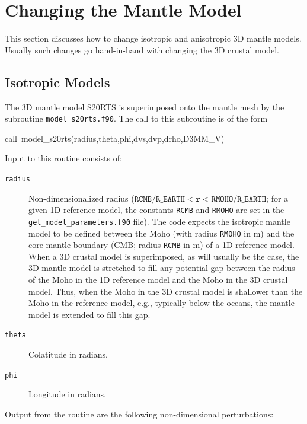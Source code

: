 \documentclass[oneside,english]{book}
\newenvironment{lyxcode}
{\begin{list}{}{
\setlength{\rightmargin}{\leftmargin}
\setlength{\listparindent}{0pt}%
\raggedright
\setlength{\itemsep}{0pt}
\setlength{\parsep}{0pt}
\normalfont\ttfamily}%
 \item[]}
{\end{list}}
\begin{document}
\section{{\normalsize \label{sec:Changing-the-Mantle}}Changing the Mantle
Model}

This section discusses how to change isotropic and anisotropic 3D
mantle models. Usually such changes go hand-in-hand with changing
the 3D crustal model.


\subsection{{\normalsize \label{sub:Isotropic-Models}Isotropic Models}}

The 3D mantle model S20RTS \citep{RiVaWo99} is superimposed onto
the mantle mesh by the subroutine \texttt{model\_s20rts.f90}. The
call to this subroutine is of the form

\begin{lyxcode}
call~model\_s20rts(radius,theta,phi,dvs,dvp,drho,D3MM\_V)~
\end{lyxcode}
Input to this routine consists of:

\begin{description}
\item [{\texttt{radius}}] Non-dimensionalized radius ($\texttt{RCMB/R\_ EARTH}<\texttt{r}<\texttt{RMOHO/R\_ EARTH}$;
for a given 1D reference model, the constants \texttt{RCMB} and \texttt{RMOHO}
are set in the \texttt{\small get\_model\_parameters}\texttt{.f90}
file). The code expects the isotropic mantle model to be defined between
the Moho (with radius \texttt{RMOHO} in m) and the core-mantle boundary
(CMB; radius \texttt{RCMB} in m) of a 1D reference model. When a 3D
crustal model is superimposed, as will usually be the case, the 3D
mantle model is stretched to fill any potential gap between the radius
of the Moho in the 1D reference model and the Moho in the 3D crustal
model. Thus, when the Moho in the 3D crustal model is shallower than
the Moho in the reference model, e.g., typically below the oceans,
the mantle model is extended to fill this gap.
\item [{\texttt{theta}}] Colatitude in radians.
\item [{\texttt{phi}}] Longitude in radians.
\end{description}
Output from the routine are the following non-dimensional perturbations:
\end{document}
